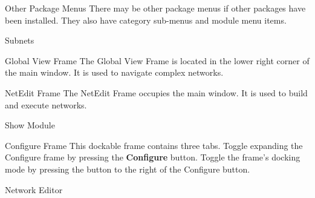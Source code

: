 \documentclass[fleqn,12pt,openany]{book}
\begin{document}
\begin{customdesc}
\begin{customdesc}
  \item[Other Package Menus]
  There may be other package menus if other packages have been installed.
  They also have category sub-menus and module menu items.
  \end{customdesc}
\item[Subnets]
\item[Global View Frame]
The Global View Frame is located in the lower right corner of the main window.
It is used to navigate complex networks.
\item[NetEdit Frame]
The NetEdit Frame occupies the main window.
It is used to build and execute networks.
\item[Show Module]
\item[Configure Frame]
This dockable frame contains three tabs.
Toggle expanding the Configure frame by pressing the \textbf{Configure} button.
Toggle the frame's docking mode by pressing the button to the right of the Configure button.
  \begin{customdesc}
  \item[Network Editor]
\begin{figure}[H]\label{net_ed_options}
\begin{centering}

\end{centering}
\end{figure}
\end{customdesc}
\end{customdesc}
\end{document}
